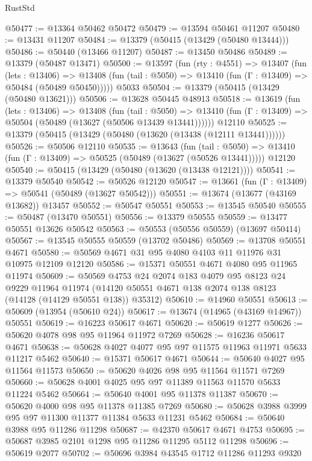 \begin{lexlean}{RustStd}
\begin{coremodule}
@50477 := @13364 @50462 @50472
@50479 := @13594 @50461 @11207
@50480 := @13431 @11207
@50484 := @13379 (@50415 (@13429 (@50480 @13444)))
@50486 := @50440 (@13466 @11207)
@50487 := @13450 @50486
@50489 := @13379 (@50487 @13471)
@50500 := @13597
    (fun (rty : @4551) =>
    @13407
      (fun (lets : @13406) =>
      @13408 (fun (tail : @5050) => @13410 (fun (Γ : @13409) => @50484 (@50489 @50450)))))
    @5033
@50504 := @13379 (@50415 (@13429 (@50480 @13621)))
@50506 := @13628 @50445 @48913
@50518 := @13619
    (fun (lets : @13406) =>
    @13408
      (fun (tail : @5050) =>
      @13410 (fun (Γ : @13409) => @50504 (@50489 (@13627 (@50506 @13439 @13441))))))
    @12110
@50525 := @13379 (@50415 (@13429 (@50480 (@13620 (@13438 (@12111 @13441))))))
@50526 := @50506 @12110
@50535 := @13643
    (fun (tail : @5050) => @13410 (fun (Γ : @13409) => @50525 (@50489 (@13627 (@50526 @13441)))))
    @12120
@50540 := @50415 (@13429 (@50480 (@13620 (@13438 @12121))))
@50541 := @13379 @50540
@50542 := @50526 @12120
@50547 := @13661 (fun (Γ : @13409) => @50541 (@50489 (@13627 @50542)))
@50551 := @13674 (@13677 (@43169 @13682)) @13457
@50552 := @50547 @50551
@50553 := @13545 @50540
@50555 := @50487 (@13470 @50551)
@50556 := @13379 @50555
@50559 := @13477 @50551 @13626 @50542
@50563 := @50553 (@50556 @50559) (@13697 @50414)
@50567 := @13545 @50555 @50559 (@13702 @50486)
@50569 := @13708 @50551 @4671
@50580 := @50569 @4671 @31 @95 @4080 @4103 @11 @11976 @31 @10975 @12109 @12120
@50586 := @15371 @50551 @4671 @4080 @95 @11965 @11974
@50609 := @50569
    @4753
    @24
    @2074
    @183
    @4079
    @95
    @8123
    @24
    @9229
    @11964
    @11974
    (@14120 @50551 @4671 @138 @2074 @138 @8123 (@14128 (@14129 @50551 @138)) @35312)
@50610 := @14960 @50551
@50613 := @50609 (@13954 (@50610 @24))
@50617 := @13674 (@14965 (@43169 @14967)) @50551
@50619 := @16223 @50617 @4671
@50620 := @50619 @1277
@50626 := @50620 @4078 @98 @95 @11964 @11972 @7269
@50628 := @16236 @50617 @4671
@50638 := @50628 @4027 @4077 @95 @97 @11575 @11963 @11971 @5633 @11217 @5462
@50640 := @15371 @50617 @4671
@50644 := @50640 @4027 @95 @11564 @11573
@50650 := @50620 @4026 @98 @95 @11564 @11571 @7269
@50660 := @50628 @4001 @4025 @95 @97 @11389 @11563 @11570 @5633 @11224 @5462
@50664 := @50640 @4001 @95 @11378 @11387
@50670 := @50620 @4000 @98 @95 @11378 @11385 @7269
@50680 := @50628 @3988 @3999 @95 @97 @11300 @11377 @11384 @5633 @11231 @5462
@50684 := @50640 @3988 @95 @11286 @11298
@50687 := @42370 @50617 @4671 @4753
@50695 := @50687 @3985 @2101 @1298 @95 @11286 @11295 @5112 @11298
@50696 := @50619 @2077
@50702 := @50696 @3984 @43545 @1712 @11286 @11293 @9320

\end{coremodule}
\end{lexlean}
